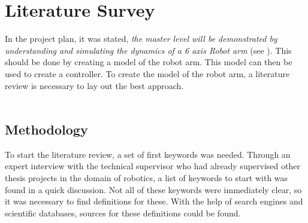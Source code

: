 \chapter{Literature Survey}

In the project plan, it was stated, \textit{the master level will be demonstrated by understanding and simulating the dynamics of a 6 axis Robot arm} (see \cite{ProjectPlan}). %
This should be done by creating a model of the robot arm. This model can then be used to create a controller.
To create the model of the robot arm, a literature review is necessary to lay out the best approach.\\
\\ 



\section{Methodology}

To start the literature review, a set of first keywords was needed. Through an expert interview with the technical supervisor %
\cite{Trung}
who had already supervised other thesis projects in the domain of robotics, a list of keywords to start with was found in a quick discussion. 
Not all of these keywords were immediately clear, so it was necessary to find definitions for these. 
With the help of search engines and scientific databases, sources for these definitions could be found.\\

